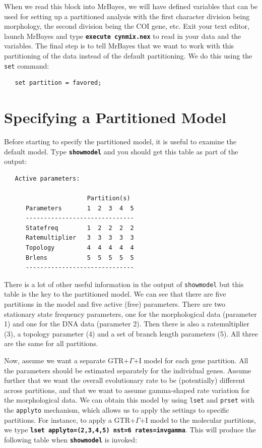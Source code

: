 \documentclass[12pt]{book}
\newcommand{\ttt}[1]{\texttt{#1}}
\newcommand{\tb}[1]{\ttt{\textbf{#1}}}
\begin{document}
When we read this block into MrBayes, we will have defined variables that can be used for setting
up a partitioned analysis with the first character division being morphology, the second division
being the COI gene, etc. Exit your text editor, launch MrBayes and type \tb{execute cynmix.nex}
to read in your data and the variables. The final step is to tell MrBayes that we want to work with
this partitioning of the data instead of the default partitioning. We do this using the \ttt{set}
command:

\begin{singlespacing}
\footnotesize
\begin{verbatim}
   set partition = favored;
\end{verbatim}
\normalsize
\end{singlespacing}


\section{Specifying a Partitioned Model}

Before starting to specify the partitioned model, it is useful to examine the default model. Type
\tb{showmodel} and you should get this table as part of the output:

\begin{singlespacing}
\footnotesize
\begin{verbatim}
   Active parameters:

                       Partition(s)
      Parameters       1  2  3  4  5
      ------------------------------
      Statefreq        1  2  2  2  2
      Ratemultiplier   3  3  3  3  3
      Topology         4  4  4  4  4
      Brlens           5  5  5  5  5
      ------------------------------
\end{verbatim}
\normalsize
\end{singlespacing}

There is a lot of other useful information in the output of \ttt{showmodel} but this table is the
key to the partitioned model. We can see that there are five partitions in the model and five
active (free) parameters. There are two stationary state frequency parameters, one for the
morphological data (parameter 1) and one for the DNA data (parameter 2). Then there is also a
ratemultiplier (3), a topology parameter (4) and a set of branch length parameters (5). All three
are the same for all partitions.

Now, assume we want a separate GTR+$\Gamma$+I model for each gene partition. All the parameters
should be estimated separately for the individual genes. Assume further that we want the overall
evolutionary rate to be (potentially) different across partitions, and that we want to assume
gamma-shaped rate variation for the morphological data. We can obtain this model by using
\ttt{lset} and \ttt{prset} with the \ttt{applyto} mechanism, which allows us to apply the settings
to specific partitions. For instance, to apply a GTR+$\Gamma$+I model to the molecular partitions,
we type \tb{lset applyto=(2,3,4,5) nst=6 rates=invgamma}. This will produce the following table
when \tb{showmodel} is invoked:
\end{document}
